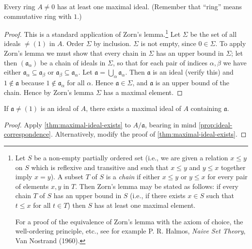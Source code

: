 \begin{theorem}\label{thm:maximal-ideal-exists}
Every ring $A \neq 0$ has at least one maximal ideal. (Remember that ``ring'' means commutative ring with $1$.)
\end{theorem}

\begin{proof}
This is a standard application of Zorn's lemma.\footnote{Let $S$ be a non-empty partially ordered set (i.e., we are given a relation $x \leq y$ on $S$ which is reflexive and transitive and such that $x \leq y$ and $y \leq x$ together imply $x = y$). A subset $T$ of $S$ is a \emph{chain} if either $x \leq y$ or $y \leq x$ for every pair of elements $x, y$ in $T$. Then Zorn's lemma may be stated as follows: if every chain $T$ of $S$ has an upper bound in $S$ (i.e., if there exists $x \in S$ such that $t \leq x$ for all $t \in T$) then $S$ has at least one maximal element.

For a proof of the equivalence of Zorn's lemma with the axiom of choice, the well-ordering principle, etc., see for example P. R. Halmos, \emph{Naive Set Theory}, Van Nostrand (1960).} Let $\Sigma$ be the set of all ideals $\neq (1)$ in $A$. Order $\Sigma$ by inclusion. $\Sigma$ is not empty, since $0 \in \Sigma$. To apply Zorn's lemma we must show that every chain in $\Sigma$ has an upper bound in $\Sigma$; let then $(\mathfrak{a}_\alpha)$ be a chain of ideals in $\Sigma$, so that for each pair of indices $\alpha, \beta$ we have either $\mathfrak{a}_\alpha \subseteq \mathfrak{a}_\beta$ or $\mathfrak{a}_\beta \subseteq \mathfrak{a}_\alpha$. Let $\mathfrak{a} = \bigcup_\alpha \mathfrak{a}_\alpha$. Then $\mathfrak{a}$ is an ideal (verify this) and $1 \notin \mathfrak{a}$ because $1 \notin \mathfrak{a}_\alpha$ for all $\alpha$. Hence $\mathfrak{a} \in \Sigma$, and $\mathfrak{a}$ is an upper bound of the chain. Hence by Zorn's lemma $\Sigma$ has a maximal element.
\end{proof}

\begin{corollary}\label{cor:ideal-in-maximal}
If $\mathfrak{a} \neq (1)$ is an ideal of $A$, there exists a maximal ideal of $A$ containing $\mathfrak{a}$.
\end{corollary}

\begin{proof}
Apply \eqref{thm:maximal-ideal-exists} to $A/\mathfrak{a}$, bearing in mind \eqref{prop:ideal-correspondence}. Alternatively, modify the proof of \eqref{thm:maximal-ideal-exists}.
\end{proof}

